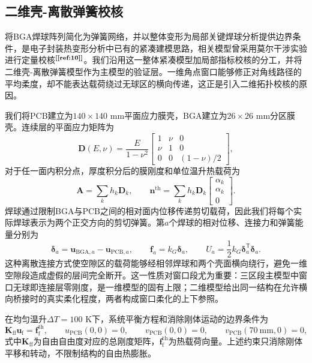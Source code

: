\documentclass[draft,12pt,a4paper]{ctexart}
\theoremstyle{definition}
\begin{document}
\subsection{二维壳-离散弹簧校核}

将BGA焊球阵列简化为弹簧网络，并以整体变形为局部关键焊球分析提供边界条件，是电子封装热变形分析中已有的紧凑建模思路，相关模型曾采用莫尔干涉实验进行定量校核$^{\textbf{[\ref{ref:10}]}}$。我们沿用这一整体紧凑模型加局部指标校核的分工，并将二维壳-离散弹簧模型作为主模型的验证层。一维角点窗口能够修正对角线路径的平均柔度，却不能表达载荷绕过无球区的横向传递，这正是引入二维拓扑校核的原因。

我们将PCB建立为$140\times140$ mm平面应力膜壳，BGA建立为$26\times26$ mm分区膜壳。连续层的平面应力矩阵为
\begin{equation}\label{eq:q3-dmat}
\mathbf D(E,\nu)=\frac{E}{1-\nu^2}
\begin{bmatrix}
1&\nu&0\\
\nu&1&0\\
0&0&(1-\nu)/2
\end{bmatrix},
\end{equation}
对于任一面内积分点，厚度积分后的膜刚度和单位温升热载荷为
\begin{equation}\label{eq:q3-membrane}
\mathbf A=\sum_k h_k\mathbf D_k,
\qquad
\mathbf n^{\mathrm{th}}=\sum_k h_k\mathbf D_k
\begin{bmatrix}\alpha_k\\\alpha_k\\0\end{bmatrix}.
\end{equation}
焊球通过限制BGA与PCB之间的相对面内位移传递剪切载荷，因此我们将每个实际焊球表示为两个正交方向的剪切弹簧。第$a$个焊球的相对位移、连接力和弹簧能量分别为
\begin{equation}\label{eq:q3-spring}
\boldsymbol\delta_a
=\mathbf u_{\mathrm{BGA},a}-\mathbf u_{\mathrm{PCB},a},
\qquad
\mathbf f_a=k_G\boldsymbol\delta_a,
\qquad
U_a=\frac12k_G\boldsymbol\delta_a^{\mathsf T}\boldsymbol\delta_a.
\end{equation}
这种离散连接方式使空隙区的载荷能够经相邻焊球和两个壳面横向绕行，避免一维空隙段造成虚假的层间完全断开。这一性质对窗口段尤为重要：三区段主模型中窗口无球即连接层零刚度，是一维模型的固有上限；二维模型给出同一结构在允许横向桥接时的真实柔化程度，两者构成窗口柔化的上下参照。

在均匀温升$\Delta T=100$ K下，系统平衡方程和消除刚体运动的边界条件为
\begin{equation}\label{eq:q3-fem}
\mathbf K_{\mathrm{ff}}\mathbf u_{\mathrm f}=\mathbf f_{\mathrm f}^{\mathrm{th}},\qquad
u_{\mathrm{PCB}}(0,0)=0,\qquad
v_{\mathrm{PCB}}(0,0)=0,\qquad
v_{\mathrm{PCB}}(70\ \mathrm{mm},0)=0,
\end{equation}
式中$\mathbf K_{\mathrm{ff}}$为自由自由度对应的总刚度矩阵，$\mathbf f_{\mathrm f}^{\mathrm{th}}$为热载荷向量。上述约束只消除刚体平移和转动，不限制结构的自由热膨胀。
\end{document}

